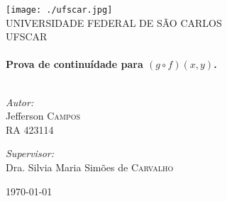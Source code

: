 \begin{titlepage}

\begin{center}

\texttt{[image: ./ufscar.jpg]}\\[1cm]    

\textsc{\LARGE UNIVERSIDADE FEDERAL DE SÃO CARLOS}\\[1.5cm]

\textsc{\Large UFSCAR}\\[0.5cm]

\HRule \\[0.4cm]
{ \huge \bfseries Prova de continuídade para $(g \circ f)(x,y)$.}\\[0.4cm]

\HRule \\[1.5cm]


\begin{minipage}{0.4\textwidth}
\begin{flushleft} \large
\emph{Autor:}\\
Jefferson \textsc{Campos}\\
RA 423114\\
\end{flushleft}
\end{minipage}
\begin{minipage}{0.4\textwidth}
\begin{flushright} \large
\emph{Supervisor:} \\
Dra. Silvia Maria Simões de  \textsc{Carvalho}
\end{flushright}
\end{minipage}

\vfill

{\large \today}

\end{center}

\end{titlepage}
